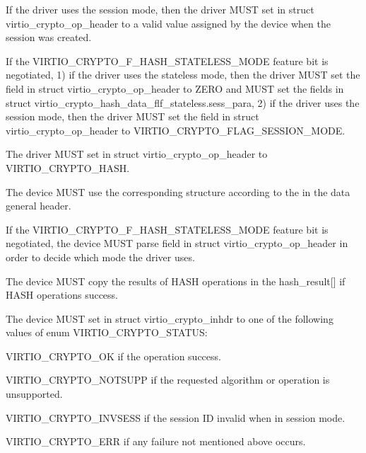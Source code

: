 \begin{itemize*}
\item If the driver uses the session mode, then the driver MUST set 
    in struct virtio_crypto_op_header to a valid value assigned by the device when the
    session was created.
\item If the VIRTIO_CRYPTO_F_HASH_STATELESS_MODE feature bit is negotiated, 1) if the
    driver uses the stateless mode, then the driver MUST set the  field in
    struct virtio_crypto_op_header to ZERO and MUST set the fields in struct
    virtio_crypto_hash_data_flf_stateless.sess_para, 2) if the driver uses the session
    mode, then the driver MUST set the  field in struct virtio_crypto_op_header
    to VIRTIO_CRYPTO_FLAG_SESSION_MODE.
\item The driver MUST set  in struct virtio_crypto_op_header to VIRTIO_CRYPTO_HASH.
\end{itemize*}


\begin{itemize*}
\item The device MUST use the corresponding structure according to the 
    in the data general header.
\item If the VIRTIO_CRYPTO_F_HASH_STATELESS_MODE feature bit is negotiated, the device
    MUST parse  field in struct virtio_crypto_op_header in order to decide
    which mode the driver uses.
\item The device MUST copy the results of HASH operations in the hash_result[] if HASH
    operations success.
\item The device MUST set  in struct virtio_crypto_inhdr to one of the
    following values of enum VIRTIO_CRYPTO_STATUS:
\begin{itemize*}
\item VIRTIO_CRYPTO_OK if the operation success.
\item VIRTIO_CRYPTO_NOTSUPP if the requested algorithm or operation is unsupported.
\item VIRTIO_CRYPTO_INVSESS if the session ID invalid when in session mode.
\item VIRTIO_CRYPTO_ERR if any failure not mentioned above occurs.
\end{itemize*}
\end{itemize*}


